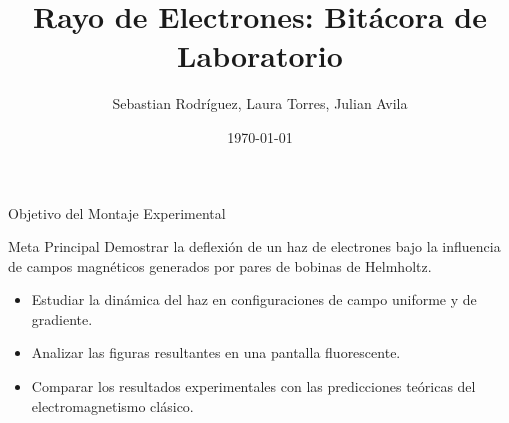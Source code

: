 \documentclass{beamer}
\title{Rayo de Electrones: Bitácora de Laboratorio}
\author{Sebastian Rodríguez, Laura Torres, Julian Avila}
\institute{Universidad Distrital Francisco José de Caldas}
\date{\today}
\begin{document}
\begin{frame}
  \titlepage
\end{frame}

\begin{frame}{Objetivo del Montaje Experimental}
  \begin{block}{Meta Principal}
    Demostrar la deflexión de un haz de electrones bajo la influencia de campos magnéticos generados por pares de bobinas de Helmholtz.
  \end{block}
  \vspace{1cm}
  \begin{itemize}
    \item Estudiar la dinámica del haz en configuraciones de campo uniforme y de gradiente.
    \item Analizar las figuras resultantes en una pantalla fluorescente.
    \item Comparar los resultados experimentales con las predicciones teóricas del electromagnetismo clásico.
  \end{itemize}
\end{frame}
\end{document}
